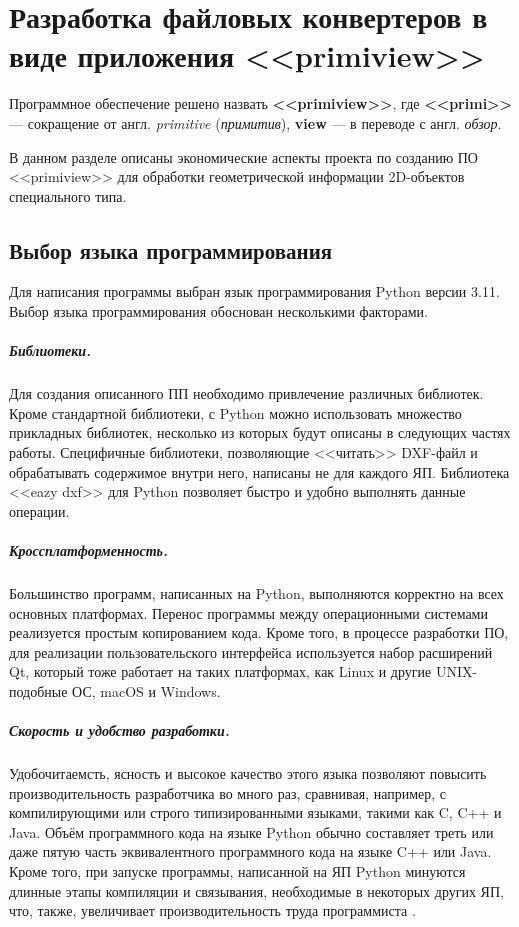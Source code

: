 \chapter{Разработка файловых конвертеров в виде приложения <<primiview>>}
\label{cha:entwickl}

Программное обеспечение решено назвать \textbf{<<primiview>>}, где \textbf{<<primi>>} --- сокращение от англ. \textit{primitive} (\textit{примитив}), \textbf{view} --- в переводе с англ. \textit{обзор}.

В данном разделе описаны экономические аспекты проекта по созданию ПО <<primiview>> для обработки геометрической информации 2D-объектов специального типа.

\section{Выбор языка программирования}
Для написания программы выбран язык программирования Python версии 3.11. Выбор языка программирования обоснован несколькими факторами.

\paragraph{Библиотеки.} Для создания описанного ПП необходимо привлечение различных библиотек. Кроме стандартной библиотеки, с Python можно использовать множество прикладных библиотек, несколько из которых будут описаны в следующих частях работы. Специфичные библиотеки, позволяющие <<читать>> DXF-файл и обрабатывать содержимое внутри него, написаны не для каждого ЯП. Библиотека <<eazy dxf>> для Python позволяет быстро и удобно выполнять данные операции.

\paragraph{Кроссплатформенность.} Большинство программ, написанных на Python, выполняются корректно на всех основных платформах. Перенос программы между операционными системами реализуется простым копированием кода. Кроме того, в процессе разработки ПО, для реализации пользовательского интерфейса используется набор расширений Qt, который тоже работает на таких платформах, как Linux и другие UNIX-подобные ОС, macOS и Windows.

\paragraph{Скорость и удобство разработки.} Удобочитаемсть, ясность и высокое качество этого языка позволяют повысить производительность разработчика во много раз, сравнивая, например, с компилирующими или строго типизированными языками, такими как C, C++ и Java. Объём программного кода на языке Python обычно составляет треть или даже пятую часть эквивалентного программного кода на языке C++ или Java. Кроме того, при запуске программы, написанной на ЯП Python минуются длинные этапы компиляции и связывания, необходимые в некоторых других ЯП, что, также, увеличивает производительность труда программиста \cite{ascher2004learning}.

